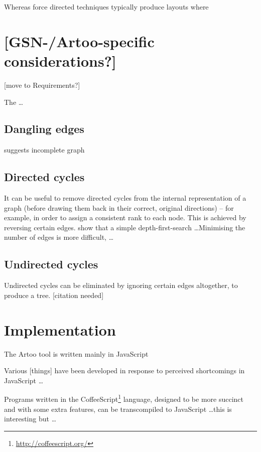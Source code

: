 Whereas force directed techniques typically produce layouts where 




\section{[GSN-/Artoo-specific considerations?]}

[move to Requirements?]

The  \ldots



\subsection{Dangling edges}

suggests incomplete graph

\subsection{Directed cycles}

It can be useful to remove directed cycles from the internal representation of a graph
(before drawing them back in their correct, original directions)
-- for example, in order to assign a consistent rank to each node.
This is achieved by reversing certain edges.
\citet{gansner1993} show that a simple depth-first-search \ldots  Minimising the number of edges is more difficult, \citeauthor{gansner1993} \ldots

\subsection{Undirected cycles}

Undirected cycles can be eliminated by ignoring certain edges altogether, to produce a tree.  [citation needed]








\section{Implementation}

The Artoo tool is written mainly in JavaScript 

Various [things] have been developed in response to perceived shortcomings in JavaScript \ldots

Programs written in the CoffeeScript\footnote{\url{http://coffeescript.org/}} language, designed to be more succinct and with some extra features, can be transcompiled to JavaScript \ldots this is interesting but \ldots

